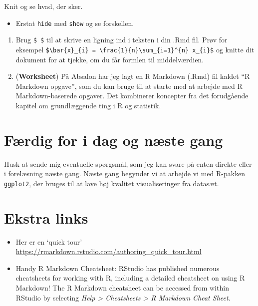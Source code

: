 \documentclass[
]{book}
\providecommand{\tightlist}{%
  \setlength{\itemsep}{0pt}\setlength{\parskip}{0pt}}
\begin{document}
Knit og se hvad, der sker.

\begin{itemize}
\tightlist
\item
  Erstat \texttt{hide} med \texttt{show} og se forskellen.
\end{itemize}

\begin{enumerate}
\def\labelenumi{\arabic{enumi})}
\setcounter{enumi}{9}
\item
  Brug \texttt{\$\ \$} til at skrive en ligning ind i teksten i din .Rmd fil. Prøv for eksempel \texttt{\$\textbackslash{}bar\{x\}\_\{i\}\ =\ \textbackslash{}frac\{1\}\{n\}\textbackslash{}sum\_\{i=1\}\^{}\{n\}\ x\_\{i\}\$} og knitte dit dokument for at tjekke, om du får formlen til middelværdien.
\item
  (\textbf{Worksheet}) På Absalon har jeg lagt en R Markdown (.Rmd) fil kaldet ``R Markdown opgave'', som du kan bruge til at starte med at arbejde med R Markdown-baserede opgaver. Det kombinerer koncepter fra det forudgående kapitel om grundlæggende ting i R og statistik.
\end{enumerate}

\section{Færdig for i dag og næste gang}\label{fuxe6rdig-for-i-dag-og-nuxe6ste-gang}

Husk at sende mig eventuelle spørgsmål, som jeg kan svare på enten direkte eller i forelæsning næste gang. Næste gang begynder vi at arbejde vi med R-pakken \texttt{ggplot2}, der bruges til at lave høj kvalitet visualiseringer fra datasæt.

\section{Ekstra links}\label{ekstra-links}

\begin{itemize}
\item
  Her er en `quick tour' \url{https://rmarkdown.rstudio.com/authoring_quick_tour.html}
\item
  Handy R Markdown Cheatsheet: RStudio has published numerous cheatsheets for working with R, including a detailed cheatsheet on using R Markdown! The R Markdown cheatsheet can be accessed from within RStudio by selecting \emph{Help \textgreater{} Cheatsheets \textgreater{} R Markdown Cheat Sheet}.
\end{itemize}


\end{document}
